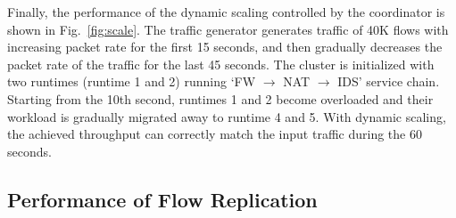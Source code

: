 Finally, the performance of the dynamic scaling controlled by the coordinator is shown in Fig.~\ref{fig:scale}. The traffic generator generates traffic of 40K flows with increasing packet rate for the first 15 seconds, and then gradually decreases the packet rate of the traffic for the last 45 seconds. %
The cluster is initialized with two runtimes (runtime 1 and 2) running `FW $\rightarrow$ NAT $\rightarrow$ IDS' service chain. Starting from the 10th second, runtimes 1 and 2 become overloaded and their workload is gradually migrated away to runtime 4 and 5. With dynamic scaling, the achieved throughput can correctly match the input traffic during the 60 seconds.

\subsection{Performance of Flow Replication}
\label{sec:rp}

